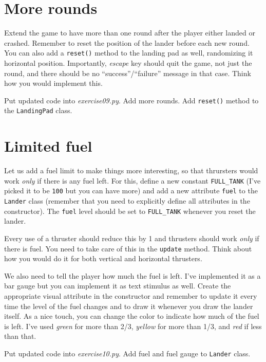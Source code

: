\documentclass[
]{book}
\begin{document}
\hypertarget{more-rounds-1}{%
\section{More rounds}\label{more-rounds-1}}

Extend the game to have more than one round after the player either landed or crashed. Remember to reset the position of the lander before each new round. You can also add a \texttt{reset()} method to the landing pad as well, randomizing it horizontal position. Importantly, \emph{escape} key should quit the game, not just the round, and there should be no ``success''/``failure'' message in that case. Think how you would implement this.

Put updated code into \emph{exercise09.py}. Add more rounds. Add \texttt{reset()} method to the \texttt{LandingPad} class.

\hypertarget{limited-fuel}{%
\section{Limited fuel}\label{limited-fuel}}

Let us add a fuel limit to make things more interesting, so that thrursters would work \emph{only} if there is any fuel left. For this, define a new constant \texttt{FULL\_TANK} (I've picked it to be \texttt{100} but you can have more) and add a new attribute \texttt{fuel} to the \texttt{Lander} class (remember that you need to explicitly define all attributes in the constructor). The \texttt{fuel} level should be set to \texttt{FULL\_TANK} whenever you reset the lander.

Every use of a thruster should reduce this by 1 and thrusters should work \emph{only} if there is fuel. You need to take care of this in the \texttt{update} method. Think about how you would do it for both vertical and horizontal thrusters.

We also need to tell the player how much the fuel is left. I've implemented it as a bar gauge but you can implement it as text stimulus as well. Create the appropriate visual attribute in the constructor and remember to update it every time the level of the fuel changes and to draw it whenever you draw the lander itself. As a nice touch, you can change the color to indicate how much of the fuel is left. I've used \emph{green} for more than 2/3, \emph{yellow} for more than 1/3, and \emph{red} if less than that.

Put updated code into \emph{exercise10.py}. Add fuel and fuel gauge to \texttt{Lander} class.
\end{document}
